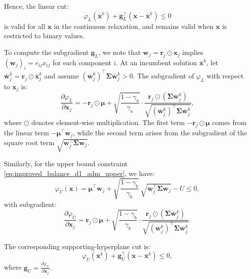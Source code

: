 \documentclass[preprint,12pt,authoryear]{elsarticle}
\begin{document}
Hence, the linear cut:
\begin{equation}
\varphi_L(\bar{\mathbf{x}}^k) + \mathbf{g}_L^\top (\mathbf{x} - \bar{\mathbf{x}}^k) \leqslant 0
\label{eq:improved_supporting_cut_lower}
\end{equation}
is valid for all $\mathbf{x}$ in the continuous relaxation, and remains valid when $\mathbf{x}$ is restricted to binary values.

To compute the subgradient $\mathbf{g}_L$, we note that $\mathbf{w}_j = \mathbf{r}_j \odot \mathbf{x}_j$ implies $(\mathbf{w}_j)_i = r_{ij} x_{ij}$ for each component $i$. At an incumbent solution $\bar{\mathbf{x}}^k$, let $\bar{\mathbf{w}}_j^k = \mathbf{r}_j \odot \bar{\mathbf{x}}_j^k$ and assume $(\bar{\mathbf{w}}_j^k)^\top \boldsymbol{\Sigma} \bar{\mathbf{w}}_j^k > 0$. The subgradient of $\varphi_L$ with respect to $\mathbf{x}_j$ is:
\begin{equation}
\frac{\partial \varphi_L}{\partial \mathbf{x}_j} = -\mathbf{r}_j \odot \boldsymbol{\mu} + \sqrt{\frac{1 - \gamma_a}{\gamma_a}} \cdot \frac{\mathbf{r}_j \odot (\boldsymbol{\Sigma} \bar{\mathbf{w}}_j^k)}{\sqrt{(\bar{\mathbf{w}}_j^k)^\top \boldsymbol{\Sigma} \bar{\mathbf{w}}_j^k}},
\label{eq:improved_subgradient_L}
\end{equation}
where $\odot$ denotes element-wise multiplication. The first term $-\mathbf{r}_j \odot \boldsymbol{\mu}$ comes from the linear term $-\boldsymbol{\mu}^\top \mathbf{w}_j$, while the second term arises from the subgradient of the square root term $\sqrt{\mathbf{w}_j^\top \boldsymbol{\Sigma} \mathbf{w}_j}$.

Similarly, for the upper bound constraint \eqref{eq:improved_balance_d1_adm_upper}, we have:
\begin{equation}
\varphi_U(\mathbf{x}) = \boldsymbol{\mu}^\top \mathbf{w}_j + \sqrt{\frac{1 - \gamma_b}{\gamma_b}} \, \sqrt{\mathbf{w}_j^\top \boldsymbol{\Sigma} \mathbf{w}_j} - U \leqslant 0,
\label{eq:improved_phi_U}
\end{equation}
with subgradient:
\begin{equation}
\frac{\partial \varphi_U}{\partial \mathbf{x}_j} = \mathbf{r}_j \odot \boldsymbol{\mu} + \sqrt{\frac{1 - \gamma_b}{\gamma_b}} \cdot \frac{\mathbf{r}_j \odot (\boldsymbol{\Sigma} \bar{\mathbf{w}}_j^k)}{\sqrt{(\bar{\mathbf{w}}_j^k)^\top \boldsymbol{\Sigma} \bar{\mathbf{w}}_j^k}}.
\label{eq:improved_subgradient_U}
\end{equation}

The corresponding supporting-hyperplane cut is:
\begin{equation}
\varphi_U(\bar{\mathbf{x}}^k) + \mathbf{g}_U^\top (\mathbf{x} - \bar{\mathbf{x}}^k) \leqslant 0,
\label{eq:improved_supporting_cut_upper}
\end{equation}
where $\mathbf{g}_U = \frac{\partial \varphi_U}{\partial \mathbf{x}_j}$.
\end{document}
